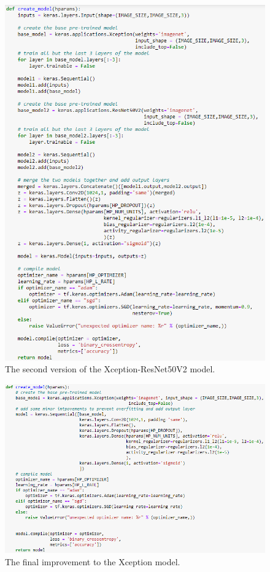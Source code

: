 \begin{figure}[H]
    \centering
    \includegraphics[width=\textwidth]{figures/xception-improvement-4.png}
    \caption{The second version of the Xception-ResNet50V2 model.}
    \label{fig:xception-improvement-4}
\end{figure}
\begin{figure}[H]
    \centering
    \includegraphics[width=\textwidth]{figures/xception-improvement-5.png}
    \caption{The final improvement to the Xception model.}
    \label{fig:xception-improvement-5}
\end{figure}

